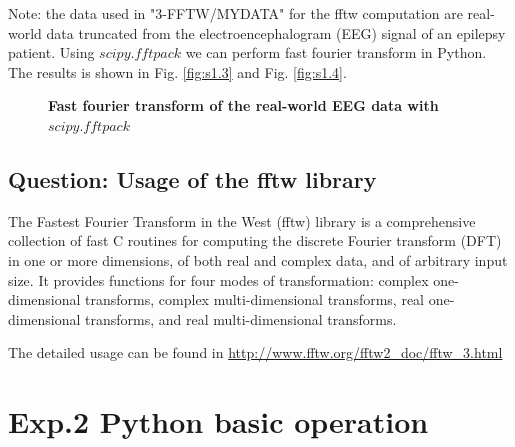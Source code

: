 \documentclass[12pt,a4paper,UTF8]{article}
\begin{document}
    Note: the data used in "3-FFTW/MYDATA" for the fftw computation are real-world data truncated from the electroencephalogram (EEG) signal
    of an epilepsy patient. Using $scipy.fftpack$ we can perform fast fourier transform in Python. The results is shown in Fig. \ref{fig:s1.3} and Fig. \ref{fig:s1.4}.
    \begin{figure}[htbp]
        \centering
        \caption{\textbf{Fast fourier transform of the real-world EEG data with $scipy.fftpack$}}
    \end{figure}

    \subsection{Question: Usage of the fftw library}
    The Fastest Fourier Transform in the West (fftw) library is a comprehensive collection 
    of fast C routines for computing the discrete Fourier transform (DFT) in one or more dimensions, 
    of both real and complex data, and of arbitrary input size.
    It provides functions for four modes of transformation: complex one-dimensional transforms, complex multi-dimensional transforms,
    real one-dimensional transforms, and real multi-dimensional transforms.

    The detailed usage can be found in \url{http://www.fftw.org/fftw2_doc/fftw_3.html}


\section{Exp.2 Python basic operation}
\end{document}
